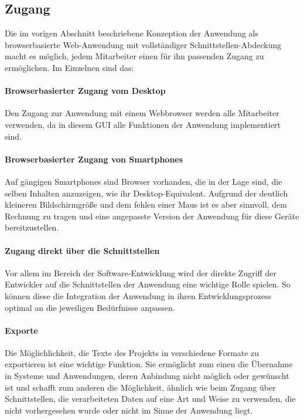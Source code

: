 \pagebreak

\subsection{Zugang}

Die im vorigen Abschnitt beschriebene Konzeption der Anwendung als browserbasierte Web-Anwendung mit vollständiger Schnittstellen-Abdeckung macht es möglich, jedem Mitarbeiter einen für ihn passenden Zugang zu ermöglichen. Im Einzelnen sind das:

\paragraph{Browserbasierter Zugang vom Desktop} Den Zugang zur Anwendung mit einem Webbrowser werden alle Mitarbeiter verwenden, da in diesem GUI alle Funktionen der Anwendung implementiert sind.

\paragraph{Browserbasierter Zugang von Smartphones} Auf gängigen Smartphones sind Browser vorhanden, die in der Lage sind, die selben Inhalten anzuzeigen, wie ihr Desktop-Equivalent. Aufgrund der deutlich kleineren Bildschirmgröße und dem fehlen einer Maus ist es aber sinnvoll, dem Rechnung zu tragen und eine angepasste Version der Anwendung für diese Geräte bereitzustellen. 

\paragraph{Zugang direkt über die Schnittstellen} Vor allem im Bereich der Software-Entwicklung wird der direkte Zugriff der Entwickler auf die Schnittstellen der Anwendung eine wichtige Rolle spielen. So können diese die Integration der Anwendung in ihren Entwicklungsprozess optimal an die jeweiligen Bedürfnisse anpassen.

\paragraph{Exporte} Die Möglichlichkeit, die Texte des Projekts in verschiedene Formate zu exportieren ist eine wichtige Funktion. Sie ermöglicht zum einen die Übernahme in Systeme und Anwendungen, deren Anbindung nicht möglich oder gewünscht ist und schafft zum anderen die Möglichkeit, ähnlich wie beim Zugang über Schnittstellen, die verarbeiteten Daten auf eine Art und Weise zu verwenden, die nicht vorhergesehen wurde oder nicht im Sinne der Anwendung liegt.

